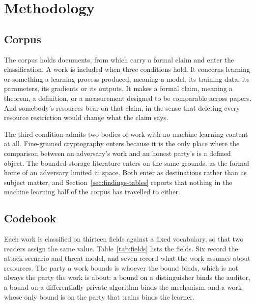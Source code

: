\section{Methodology}
\label{sec:method}

\subsection{Corpus}

The corpus holds \NumPapers{} documents, from which \NumSources{} carry a formal
claim and enter the classification. A work is included when three conditions hold.
It concerns learning or something a learning process produced, meaning a model, its
training data, its parameters, its gradients or its outputs. It makes a formal
claim, meaning a theorem, a definition, or a measurement designed to be comparable
across papers. And somebody's resources bear on that claim, in the sense that
deleting every resource restriction would change what the claim says.

The third condition admits two bodies of work with no machine learning content at
all. Fine-grained cryptography enters because it is the only place where the
comparison between an adversary's work and an honest party's is a defined object.
The bounded-storage literature enters on the same grounds, as the formal home of an
adversary limited in space. Both enter as destinations rather than as subject
matter, and Section~\ref{sec:findings-tables} reports that nothing in the machine
learning half of the corpus has travelled to either.

\subsection{Codebook}

Each work is classified on thirteen fields against a fixed vocabulary, so that two
readers assign the same value. Table~\ref{tab:fields} lists the fields. Six record
the attack scenario and threat model, and seven record what the work assumes about
resources. The party a work bounds is whoever the bound binds, which is not always
the party the work is about: a bound on a distinguisher binds the auditor, a bound
on a differentially private algorithm binds the mechanism, and a work whose only
bound is on the party that trains binds the learner.

